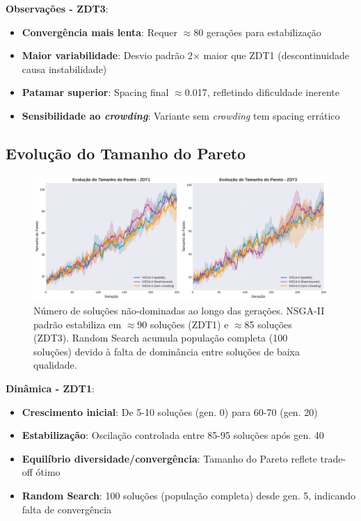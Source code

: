 \textbf{Observações - ZDT3}:
\begin{itemize}
    \item \textbf{Convergência mais lenta}: Requer $\approx$80 gerações para estabilização
    \item \textbf{Maior variabilidade}: Desvio padrão 2× maior que ZDT1 (descontinuidade causa instabilidade)
    \item \textbf{Patamar superior}: Spacing final $\approx$0.017, refletindo dificuldade inerente
    \item \textbf{Sensibilidade ao \textit{crowding}}: Variante sem \textit{crowding} tem spacing errático
\end{itemize}

\subsection{Evolução do Tamanho do Pareto}

\begin{figure}[H]
    \centering
    \includegraphics[width=\textwidth]{../plots/G_pareto_size_evolution.pdf}
    \caption{Número de soluções não-dominadas ao longo das gerações. NSGA-II padrão estabiliza em $\approx$90 soluções (ZDT1) e $\approx$85 soluções (ZDT3). Random Search acumula população completa (100 soluções) devido à falta de dominância entre soluções de baixa qualidade.}
    \label{fig:pareto_size}
\end{figure}

\textbf{Dinâmica - ZDT1}:
\begin{itemize}
    \item \textbf{Crescimento inicial}: De 5-10 soluções (gen. 0) para 60-70 (gen. 20)
    \item \textbf{Estabilização}: Oscilação controlada entre 85-95 soluções após gen. 40
    \item \textbf{Equilíbrio diversidade/convergência}: Tamanho do Pareto reflete trade-off ótimo
    \item \textbf{Random Search}: 100 soluções (população completa) desde gen. 5, indicando falta de convergência
\end{itemize}

